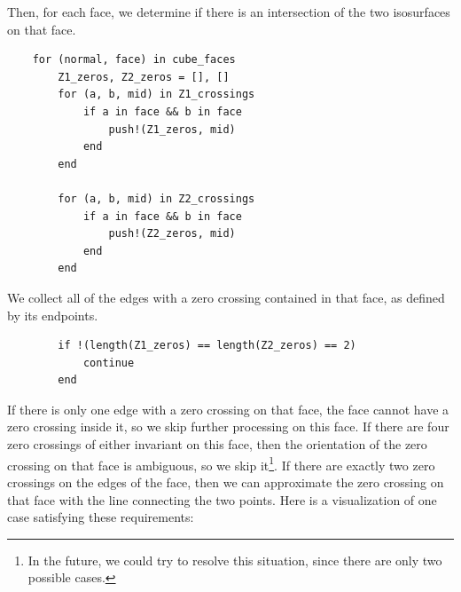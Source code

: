 \documentclass{article}
\begin{document}
Then, for each face, we determine if there is an intersection of the two isosurfaces on that face.
\begin{lstlisting}
    for (normal, face) in cube_faces
        Z1_zeros, Z2_zeros = [], []
        for (a, b, mid) in Z1_crossings
            if a in face && b in face
                push!(Z1_zeros, mid)
            end
        end

        for (a, b, mid) in Z2_crossings
            if a in face && b in face
                push!(Z2_zeros, mid)
            end
        end
\end{lstlisting}
We collect all of the edges with a zero crossing contained in that face, as defined by its endpoints.
\begin{lstlisting}
        if !(length(Z1_zeros) == length(Z2_zeros) == 2)
            continue
        end
\end{lstlisting}
If there is only one edge with a zero crossing on that face, the face cannot have a zero crossing inside it, so we skip further processing on this face.
If there are four zero crossings of either invariant on this face, then the orientation of the zero crossing on that face is ambiguous, so we skip it\footnote{In the future, we could try to resolve this situation, since there are only two possible cases.}.
If there are exactly two zero crossings on the edges of the face, then we can approximate the zero crossing on that face with the line connecting the two points.
Here is a visualization of one case satisfying these requirements:
\end{document}
